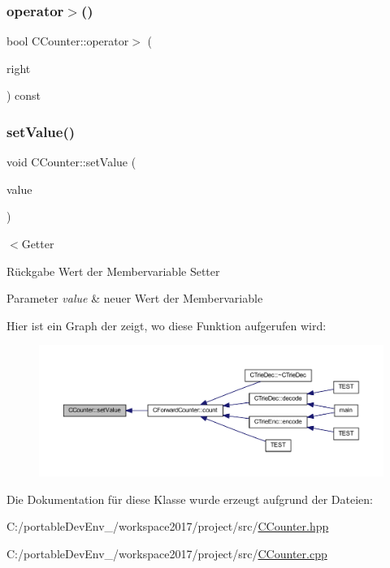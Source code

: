 \subsubsection{\texorpdfstring{operator$>$()}{operator>()}}
{\footnotesize\ttfamily bool C\+Counter\+::operator$>$ (\begin{DoxyParamCaption}\item[{const \hyperlink{class_c_counter}{C\+Counter} \&}]{right }\end{DoxyParamCaption}) const}

\mbox{\label{class_c_counter_ac41245afdd95c0149e99bad21696a372}} 
\subsubsection{\texorpdfstring{set\+Value()}{setValue()}}
{\footnotesize\ttfamily void C\+Counter\+::set\+Value (\begin{DoxyParamCaption}\item[{int}]{value }\end{DoxyParamCaption})}

$<$Getter \begin{DoxyReturn}{Rückgabe}
Wert der Membervariable Setter 
\end{DoxyReturn}

\begin{DoxyParams}{Parameter}
{\em value} & neuer Wert der Membervariable \\
\hline
\end{DoxyParams}
Hier ist ein Graph der zeigt, wo diese Funktion aufgerufen wird\+:
\nopagebreak
\begin{figure}[H]
\begin{center}
\leavevmode
\includegraphics[width=350pt]{class_c_counter_ac41245afdd95c0149e99bad21696a372_icgraph}
\end{center}
\end{figure}


Die Dokumentation für diese Klasse wurde erzeugt aufgrund der Dateien\+:\begin{DoxyCompactItemize}
\item 
C\+:/portable\+Dev\+Env\+\_/workspace2017/project/src/\hyperlink{_c_counter_8hpp}{C\+Counter.\+hpp}\item 
C\+:/portable\+Dev\+Env\+\_/workspace2017/project/src/\hyperlink{_c_counter_8cpp}{C\+Counter.\+cpp}\end{DoxyCompactItemize}
